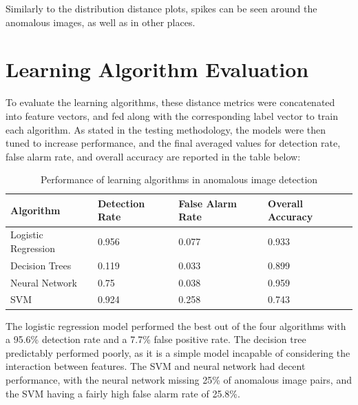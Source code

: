 Similarly to the distribution distance plots, spikes can be seen around the anomalous images, as well as in other places.

\section{Learning Algorithm Evaluation}

To evaluate the learning algorithms, these distance metrics were concatenated into feature vectors, and fed along with the corresponding label vector to train each algorithm.
As stated in the testing methodology, the models were then tuned to increase performance, and the final averaged values for detection rate, false alarm rate, and overall accuracy are reported in the table below:

\begin{table}[h!]
	\centering
	\begin{tabular}{|l|l|l|l|}
		\hline
		Algorithm & Detection Rate & False Alarm Rate & Overall Accuracy  \\ \hline
		Logistic Regression & 0.956 & 0.077 & 0.933  \\ \hline
		Decision Trees & 0.119 & 0.033 & 0.899  \\ \hline
		Neural Network & 0.75 & 0.038 & 0.959  \\ \hline
		SVM & 0.924 & 0.258  & 0.743 \\ \hline
	\end{tabular}
	\caption{Performance of learning algorithms in anomalous image detection}
\end{table}


The logistic regression model performed the best out of the four algorithms with a 95.6\% detection rate and a 7.7\% false positive rate.
The decision tree predictably performed poorly, as it is a simple model incapable of considering the interaction between features.
The SVM and neural network had decent performance, with the neural network missing 25\% of anomalous image pairs, and the SVM having a fairly high false alarm rate of 25.8\%.



